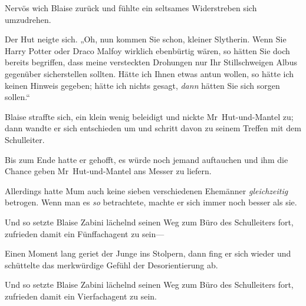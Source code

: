 Nervös wich Blaise zurück und fühlte ein seltsames Widerstreben sich umzudrehen.

Der Hut neigte sich.
„Oh, nun kommen Sie schon, kleiner Slytherin. Wenn Sie Harry Potter oder Draco Malfoy wirklich ebenbürtig wären, so hätten Sie doch bereits begriffen, dass meine versteckten Drohungen nur Ihr Stillschweigen Albus gegenüber sicherstellen sollten. Hätte ich Ihnen etwas antun wollen, so hätte ich keinen Hinweis gegeben; hätte ich nichts gesagt, \emph{dann} hätten Sie sich sorgen sollen.“

Blaise straffte sich, ein klein wenig beleidigt und nickte Mr~Hut-und-Mantel zu; dann wandte er sich entschieden um und schritt davon zu seinem Treffen mit dem Schulleiter.

Bis zum Ende hatte er gehofft, es würde noch jemand auftauchen und ihm die Chance geben Mr~Hut-und-Mantel ans Messer zu liefern.

Allerdings hatte Mum auch keine sieben verschiedenen Ehemänner \emph{gleichzeitig} betrogen. Wenn man es \emph{so} betrachtete, machte er sich immer noch besser als sie.

Und so setzte Blaise Zabini lächelnd seinen Weg zum Büro des Schulleiters fort, zufrieden damit ein Fünffachagent zu sein—

Einen Moment lang geriet der Junge ins Stolpern, dann fing er sich wieder und schüttelte das merkwürdige Gefühl der Desorientierung ab.

Und so setzte Blaise Zabini lächelnd seinen Weg zum Büro des Schulleiters fort, zufrieden damit ein Vierfachagent zu sein.

